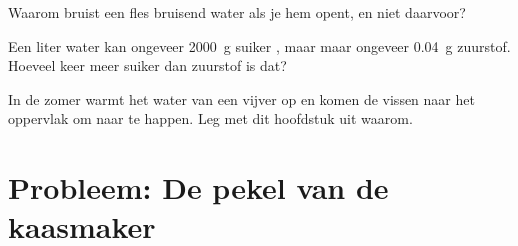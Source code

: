 \begin{exercise}[$\star\star$]\label{exo:g6:solutions-and-solubility:10}
Waarom bruist een fles bruisend water als je hem opent, en niet
daarvoor?
\end{exercise}

\begin{exercise}[$\star\star\star$]\label{exo:g6:solutions-and-solubility:11}
Een liter water kan ongeveer \qty{2000}{g} suiker , maar maar
ongeveer \qty{0.04}{g} zuurstof. Hoeveel keer meer suiker dan zuurstof is
dat?
\end{exercise}

\begin{exercise}[$\star\star\star$]\label{exo:g6:solutions-and-solubility:12}
In de zomer warmt het water van een vijver op en komen de vissen naar
het oppervlak om naar  te happen. Leg met dit hoofdstuk uit
waarom.
\end{exercise}

\section{Probleem: De pekel van de kaasmaker}

